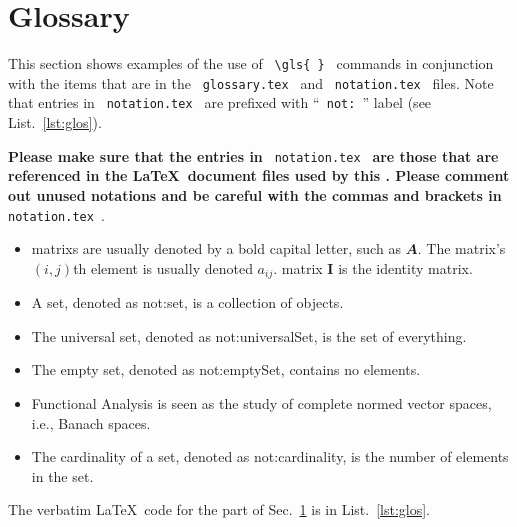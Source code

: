 \newpage
\section{Glossary}
\label{sec:glos}

This section shows examples of the use of \verb| \gls{ } | commands in conjunction with the items that are in the \verb| glossary.tex | and \verb| notation.tex | files.  Note that entries in  \verb| notation.tex |  are prefixed with ``\verb| not: |'' label (see List.~\ref{lst:glos}).

\textbf{Please make sure that the entries in} \verb| notation.tex |\textbf{  are those that are referenced in the \LaTeX \ document files used by this \documentType.  Please comment out unused notations and be careful with the commas and brackets  in} \verb| notation.tex |.

\begin{itemize}

	\item \Glspl{matrix} are usually denoted by a bold capital letter, such as $\mathbfit{A}$. The \gls{matrix}'s $(i,j)$th element is usually denoted $a_{ij}$. \Gls{matrix} $\mathbf{I}$ is the identity \gls{matrix}.

	\item A set, denoted as \gls{not:set}, is a collection of objects.

	\item The universal set,  denoted as \gls{not:universalSet}, is the set of everything.

	\item The empty set, denoted as \gls{not:emptySet}, contains no elements.
	
	\item \Gls{Functional Analysis} is seen as the study of complete normed vector spaces, i.e., Banach spaces.
	
	\item The cardinality of a set, denoted as \gls{not:cardinality}, is the number of elements in the set.

\end{itemize}


The verbatim \LaTeX \ code for the part of Sec.~\ref{sec:glos} is in List.~\ref{lst:glos}.

